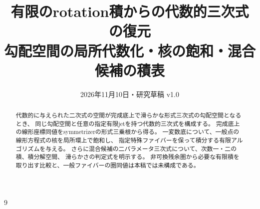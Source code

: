 \documentclass[a4paper,11pt]{ltjsarticle}
\title{有限のrotation積からの代数的三次式の復元\\
\large 勾配空間の局所代数化・核の飽和・混合候補の積表}
\author{}
\date{2026年11月10日・研究草稿 v1.0}
\theoremstyle{definition}
\begin{document}
\maketitle
\begin{abstract}
代数的に与えられた二次式の空間が完成底上で滑らかな形式三次式の勾配空間となるとき、
同じ勾配空間と任意の指定有限jetを持つ代数的三次式を構成する。
完成底上の線形座標同値をsymmetrizerの形式三乗根から得る。
一変数底について、一般点の線形方程式の核を局所環上で飽和し、
指定特殊ファイバーを保って積分する有限アルゴリズムを与える。
さらに混合候補の二パラメータ三次式について、次数一・二の積、積分解空間、
滑らかさの判定式を明示する。
非可換残余圏から必要な有限積を取り出す比較と、一般ファイバーの圏同値は本稿では未構成である。
\end{abstract}
\tableofcontents

\begin{thebibliography}{9}

\end{thebibliography}
\end{document}
